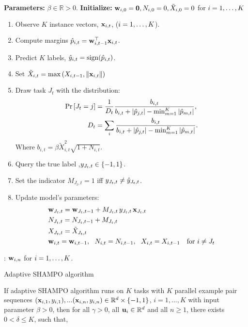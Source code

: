 {\begin{algorithm}[!h]
\begin{algorithmic}
   \State \textbf{Parameters:}  $\beta\in\mathbb{R}>0$.
   \State \textbf{Initialize:} $\mathbf{w}_{i,0}={\boldsymbol{0}}, N_{i,0}=0, \tilde{X}_{i,0}=0$ for $i=1, \ldots , K$\\
   \begin{enumerate}
\nolineskips
\item Observe $K$ instance vectors, $\mathbf{x}_{i,t}$, ($i=1 , \ldots , K$).
\item Compute margins $\hat{p}_{i,t}={\mathbf{w}}^{\top}_{i,t-1} \mathbf{x}_{i,t}$.
\item Predict $K$ labels, $\hat{y}_{i,t}={\rm sign}(\hat{p}_{i,t})$.
\item Set $\tilde{X}_{i,t}=\max\left({X_{i,t-1},\Vert\mathbf{x}_{i,t}\Vert}\right)$
\item Draw task $J_t$  with the distribution:
\begin{align}
{\rm Pr}\left[{J_t=j}\right] &=
\frac{1}{D_t}\frac{b_{i,t}}{b_{i,t}+\left\vert{\hat{p}_{j,t}}\right\vert-\min_{m=1}^K\left\vert{\hat{p}_{m,t}}\right\vert},\nonumber\\
D_t &=
\sum_i \frac{b_{i,t}}{b_{i,t}+\left\vert{\hat{p}_{j,t}}\right\vert-\min_{m=1}^K\left\vert{\hat{p}_{m,t}}\right\vert}.\nonumber
\end{align}
Where $b_{i,t} = \beta \tilde{X}_{i,t}^2\sqrt{1+N_{i,t}}$.
\item Query the true label ,$y_{J_t,t}\in\{-1,1\}$.
\item Set the indicator $M_{J_t, t}=1$ iff $y_{J_t,t} \neq \hat{y}_{J_t,t}$.
\item Update model's parameters:
\begin{align*}
&\mathbf{w}_{J_t,t} = \mathbf{w}_{J_t,t-1}+M_{J_t,t} \, y_{J_t,t}\, \mathbf{x}_{J_t,t} \\
&N_{J_t,t} = N_{J_t,t-1} +M_{J_t,t} \\
&X_{J_t,t} = \tilde{X}_{J_t,t} \\
&\mathbf{w}_{i,t} = \mathbf{w}_{i,t-1},~~ N_{i,t} = N_{i,t-1}, ~~X_{i,t} = X_{i,t-1}~~ \textrm{ for } i \neq J_t
\end{align*}
\end{enumerate}   \EndFor  
   : $\mathbf{w}_{i,n}$ for $i=1 , \ldots , K$.
\end{algorithmic}
\caption{Adaptive SHAMPO algorithm \label{alg:SHAMPO_adaptive}}
\end{algorithm}

\begin{theorem}
  If adaptive SHAMPO algorithm runs on $K$ tasks with $K$ parallel example pair
  sequences
  $(\mathbf{x}_{i,1},y_{i,1}),...(\mathbf{x}_{i,n},y_{i,n})\in\mathbb{R}^d\times\{-1,1\}$,
  $i=1,...,K$ with input parameter $\beta>0$, then for all $\gamma>0$, all
  $\mathbf{u}_{i}\in\mathbb{R}^d$ and all $n\ge1$, there exists $0<\delta\le K$, such that,
  

\end{theorem}}
